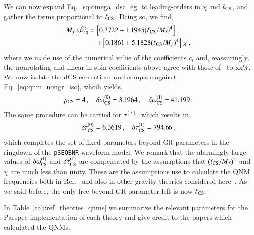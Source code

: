 \documentclass[twocolumn,prd,aps,superscriptaddress,preprintnumbers,tightenlines,showpacs,nofootinbib,amsfonts,amsmath,longbibliography]{revtex4-1}
\newcommand{\Mf}{M_f}
\newcommand{\pSEOB}{\texttt{pSEOBNR}}
\begin{document}
We can now expand Eq.~\eqref{eq:omega_dsc_eg} to leading-orders in $\chi$ and $\ell_{\rm CS}$, and
gather the terms proportional to $\ell_{\rm CS}$.
%
Doing so, we find,
%
\begin{align}
    \Mf \, \omega^{\rm CS}_{220} &=
    \left[ 0.3722 + 1.1945 (\ell_{\rm CS} / \Mf)^4 \right]
    \nonumber \\
    &\quad + \left[0.1861 + 5.1828 (\ell_{\rm CS} / \Mf)^4 \right] \, \chi\,,
\end{align}
%
where we made use of the numerical value of the coefficients $c_{i}$ and,
reassuringly, the nonrotating and linear-in-spin coefficients above agree with those
of~\cite{Maselli:2019mjd} to xx\%.
%
We now isolate the dCS corrections and compare against Eq.~\eqref{eq:qnm_nongr_iso},
whcih yields,
%
\begin{equation}
p_{\rm CS} = 4\,, \quad \delta \omega^{(0)}_{\rm CS} = 3.1964\,, \quad \delta \omega^{(1)}_{\rm CS} = 41.199\,.
\label{eq:cs_omega_coefs}
\end{equation}
%
The same procedure can be carried for $\tau^{(i)}$, which results in,
%
\begin{equation}
\delta \tau^{(0)}_{\rm CS} = 6.3619\,, \quad \delta \tau^{(1)}_{\rm CS} = 794.66\,.
\label{eq:cs_tau_coefs}
\end{equation}
%
which completes the set of fixed parameters beyond-GR parameters in the ringdown of the \pSEOB{} waveform model.
%
We remark that the alarmingly large values of $\delta \omega_{\rm CS}^{(1)}$ and $\delta \tau_{\rm CS}^{(1)}$
are compensated by the assumptions that $(\ell_{\rm CS} / M_f)^2$ and $\chi$ are much less than unity. These
are the assumptions use to calculate the QNM frequencies both in Ref.~\cite{Wagle:2021tam} and also in
other gravity theories considered here~\cite{Pierini:2021jxd,Cano:2021myl}.
%
As we said before, the only free beyond-GR parameter left is now $\ell_{\rm CS}$.

In Table~\ref{tab:ref_theories_qnms} we summarize the relevant parameters for
the {\sc Parspec} implementation of each theory and give credit to the papers
which calculated the QNMs.
\end{document}
